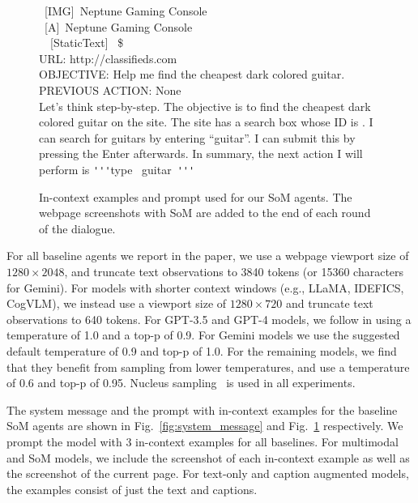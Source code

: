 \begin{figure}[th]
{{\rbrack\ [IMG]\ \lbrack Neptune Gaming Console\rbrack\\
\rbrack\ [A]\ \lbrack Neptune Gaming Console\rbrack\\
\lbrack\ \rbrack\ [StaticText]\  \$\rbrack\\
URL: http://classifieds.com\\
OBJECTIVE: Help me find the cheapest dark colored guitar.\\
PREVIOUS ACTION: None
\\
{\color{red}{example\_assistant:}} Let's think step-by-step. The objective is to find the cheapest dark colored guitar on the site. The site has a search box whose ID is \rbrack. I can search for guitars by entering ``guitar''. I can submit this by pressing the Enter afterwards. In summary, the next action I will perform is \texttt{\'}\texttt{\'}\texttt{\'}type \rbrack\ \lbrack guitar\rbrack\  \rbrack\texttt{\'}\texttt{\'}\texttt{\'}
}
}
\caption{In-context examples and prompt used for our SoM agents. The webpage screenshots with SoM are added to the end of each round of the {\color{red}{example\_user}} dialogue.}  \label{fig:prompt}
\end{figure}


For all baseline agents we report in the paper, we use a webpage viewport size of $1280 \times 2048$, and truncate text observations to 3840 tokens (or 15360 characters for Gemini). For models with shorter context windows (e.g., LLaMA, IDEFICS, CogVLM), we instead use a viewport size of $1280 \times 720$ and truncate text observations to 640 tokens. For GPT-3.5 and GPT-4 models, we follow \cite{zhou2023webarena} in using a temperature of 1.0 and a top-p of 0.9. For Gemini models we use the suggested default temperature of 0.9 and top-p of 1.0. For the remaining models, we find that they benefit from sampling from lower temperatures, and use a temperature of 0.6 and top-p of 0.95. Nucleus sampling~\citep{holtzman2019curious} is used in all experiments. 

The system message and the prompt with in-context examples for the baseline SoM agents are shown in Fig.~\ref{fig:system_message} and Fig.~\ref{fig:prompt} respectively. We prompt the model with 3 in-context examples for all baselines. For multimodal and SoM models, we include the screenshot of each in-context example as well as the screenshot of the current page. For text-only and caption augmented models, the examples consist of just the text and captions.

